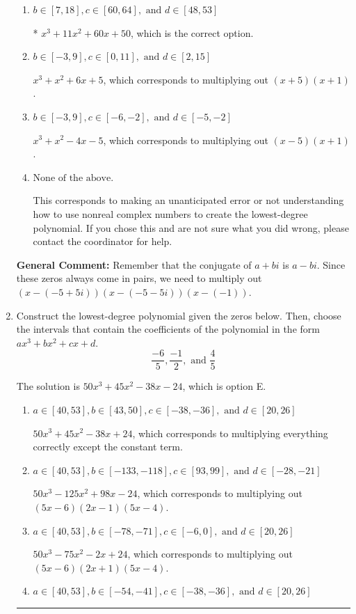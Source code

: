\documentclass{extbook}[14pt]
\newcommand{\litem}[1]{\item #1

\rule{\textwidth}{0.4pt}}
\begin{document}
\begin{enumerate}
{\begin{enumerate}[label=\Alph*.]
$x^{3} -11 x^{2} +60 x -50$, which corresponds to multiplying out $(x-(-5 + 5 i))(x-(-5 - 5 i))(x -1)$.
\item \( b \in [7, 18], c \in [60, 64], \text{ and } d \in [48, 53] \)

* $x^{3} +11 x^{2} +60 x + 50$, which is the correct option.
\item \( b \in [-3, 9], c \in [0, 11], \text{ and } d \in [2, 15] \)

$x^{3} + x^{2} +6 x + 5$, which corresponds to multiplying out $(x + 5)(x + 1)$.
\item \( b \in [-3, 9], c \in [-6, -2], \text{ and } d \in [-5, -2] \)

$x^{3} + x^{2} -4 x -5$, which corresponds to multiplying out $(x -5)(x + 1)$.
\item \( \text{None of the above.} \)

This corresponds to making an unanticipated error or not understanding how to use nonreal complex numbers to create the lowest-degree polynomial. If you chose this and are not sure what you did wrong, please contact the coordinator for help.
\end{enumerate}

\textbf{General Comment:} Remember that the conjugate of $a+bi$ is $a-bi$. Since these zeros always come in pairs, we need to multiply out $(x-(-5 + 5 i))(x-(-5 - 5 i))(x-(-1))$.
}
\litem{
Construct the lowest-degree polynomial given the zeros below. Then, choose the intervals that contain the coefficients of the polynomial in the form $ax^3+bx^2+cx+d$.
\[ \frac{-6}{5}, \frac{-1}{2}, \text{ and } \frac{4}{5} \]

The solution is \( 50x^{3} +45 x^{2} -38 x -24 \), which is option E.\begin{enumerate}[label=\Alph*.]
\item \( a \in [40, 53], b \in [43, 50], c \in [-38, -36], \text{ and } d \in [20, 26] \)

$50x^{3} +45 x^{2} -38 x + 24$, which corresponds to multiplying everything correctly except the constant term.
\item \( a \in [40, 53], b \in [-133, -118], c \in [93, 99], \text{ and } d \in [-28, -21] \)

$50x^{3} -125 x^{2} +98 x -24$, which corresponds to multiplying out $(5x -6)(2x -1)(5x -4)$.
\item \( a \in [40, 53], b \in [-78, -71], c \in [-6, 0], \text{ and } d \in [20, 26] \)

$50x^{3} -75 x^{2} -2 x + 24$, which corresponds to multiplying out $(5x -6)(2x + 1)(5x -4)$.
\item \( a \in [40, 53], b \in [-54, -41], c \in [-38, -36], \text{ and } d \in [20, 26] \)


\end{enumerate}}
\end{enumerate}
\end{document}
